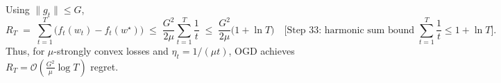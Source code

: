 \documentclass[12pt]{article}
\begin{document}
Using $\|g_t\|\le G$,
\[
R_T \;=\; \sum_{t=1}^T \bigl(f_t(w_t)-f_t(w^\star)\bigr) 
\;\le\; \frac{G^2}{2\mu}\sum_{t=1}^T \frac{1}{t} 
\;\le\; \frac{G^2}{2\mu}\bigl(1+\ln T\bigr)
\quad \text{[Step 33: harmonic sum bound } \sum_{t=1}^T \frac{1}{t}\le 1+\ln T].
\]
Thus, for $\mu$-strongly convex losses and $\eta_t=1/(\mu t)$, OGD achieves $R_T=\mathcal{O}\!\left(\frac{G^2}{\mu}\log T\right)$ regret.
\end{document}
